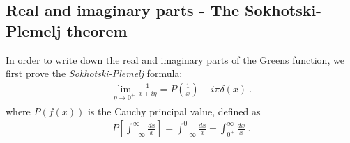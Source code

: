 \documentclass[reprint,hidelinks,onecolumn]{revtex4-2}
\begin{document}
\subsection{Real and imaginary parts - The Sokhotski-Plemelj theorem}
In order to write down the real and imaginary parts of the Greens function, we first prove the {\it Sokhotski-Plemelj} formula:
\begin{equation}\begin{aligned}\label{SokhotskiPlemelj}
	\lim_{\eta \to 0^+} \frac{1}{x + i \eta} = P\left(\frac{1}{x}\right) - i \pi \delta(x)~.
\end{aligned}\end{equation}
where \(P(f(x))\) is the Cauchy principal value, defined as 
\begin{equation}\begin{aligned}
	P\left[\int_{-\infty}^{\infty}\frac{dx}{x}\right] = \int_{-\infty}^{0^-}\frac{dx}{x} + \int_{0^+}^{\infty}\frac{dx}{x}~.
\end{aligned}\end{equation}
\end{document}
